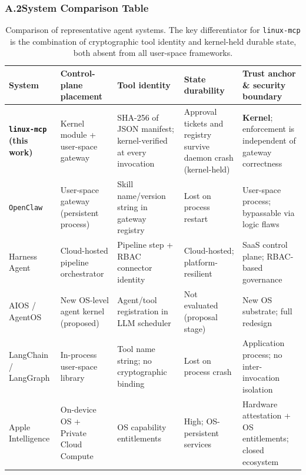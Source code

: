 \subsubsection*{A.2\quad System Comparison Table}
{}
\label{sec:appendix-comparison}

\begin{table}[htbp]
\centering
\footnotesize
\renewcommand{\arraystretch}{1.35}
\setlength{\tabcolsep}{5pt}
\begin{tabular}{p{2.0cm} p{2.8cm} p{2.6cm} p{2.6cm} p{4.2cm}}
\toprule
\textbf{System}
  & \textbf{Control-plane placement}
  & \textbf{Tool identity}
  & \textbf{State durability}
  & \textbf{Trust anchor \& security boundary} \\
\midrule

\rowcolor{gray!12}
\textbf{\texttt{linux-mcp}} \newline\textbf{(this work)}
  & Kernel module + user-space gateway
  & SHA-256 of JSON manifest; kernel-verified at every invocation
  & Approval tickets and registry survive daemon crash (kernel-held)
  & \textbf{Kernel}; enforcement is independent of gateway correctness \\

\texttt{OpenClaw} \cite{openclaw2026}
  & User-space gateway (persistent process)
  & Skill name/version string in gateway registry
  & Lost on process restart
  & User-space process; bypassable via logic flaws \cite{openclaw_security1, openclaw_security2} \\

\rowcolor{gray!12}
Harness Agent \cite{harness2025}
  & Cloud-hosted pipeline orchestrator
  & Pipeline step + RBAC connector identity
  & Cloud-hosted; platform-resilient
  & SaaS control plane; RBAC-based governance \\

AIOS / AgentOS \cite{mei2024aios, liu2026agentos}
  & New OS-level agent kernel (proposed)
  & Agent/tool registration in LLM scheduler
  & Not evaluated (proposal stage)
  & New OS substrate; full redesign \\

\rowcolor{gray!12}
LangChain / LangGraph \cite{langchain2022, langgraph2024}
  & In-process user-space library
  & Tool name string; no cryptographic binding
  & Lost on process crash
  & Application process; no inter-invocation isolation \\

Apple Intelligence \cite{apple2024pcc}
  & On-device OS + Private Cloud Compute
  & OS capability entitlements
  & High; OS-persistent services
  & Hardware attestation + OS entitlements; closed ecosystem \\

\bottomrule
\end{tabular}
\caption{Comparison of representative agent systems. The key differentiator for \texttt{linux-mcp} is the combination of cryptographic tool identity and kernel-held durable state, both absent from all user-space frameworks.}
\label{tab:system_comparison}
\end{table}
